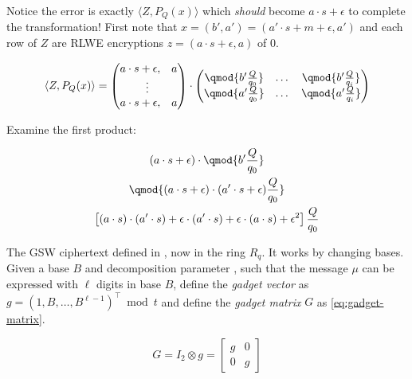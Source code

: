 \noindent Notice the error is exactly $\langle Z, P_Q(x)\rangle$ which \textit{should} become $a \cdot s + \epsilon$ to complete the transformation! First note that $x = (b', a') = (a'\cdot s + m + \epsilon, a')$ and each row of $Z$ are RLWE encryptions $z = (a\cdot s + \epsilon, a)$ of 0.

\begin{equation*}
    \langle Z, P_Q(x)\rangle = 
        \begin{pmatrix}
            a\cdot s + \epsilon, & a \\
            \quad\;\vdots \\
            a\cdot s + \epsilon, & a \\
        \end{pmatrix}\cdot 
        \begin{pmatrix}
            \qmod{b'\frac{Q}{q_0}} & \dots & \qmod{b'\frac{Q}{q_i}} \\
            \qmod{a'\frac{Q}{q_0}} & \dots & \qmod{a'\frac{Q}{q_i}}
        \end{pmatrix}
\end{equation*}

\noindent Examine the first product:

\begin{gather*}
    (a\cdot s + \epsilon) \cdot \qmod{b'\frac{Q}{q_0}} \\
    \qmod{(a\cdot s + \epsilon) \cdot (a'\cdot s + \epsilon)\frac{Q}{q_0}} \\
    \left[(a\cdot s) \cdot (a'\cdot s) + \epsilon\cdot (a'\cdot s) + \epsilon\cdot (a\cdot s) + \epsilon^2 \right]\frac{Q}{q_0}
\end{gather*}

\newpage
The GSW ciphertext defined in \cite{cryptoeprint:2013/340}, now in the ring $R_q$. It works by changing bases. Given a base $B$ and decomposition parameter \paramDecomp, such that the message $\mu$ can be expressed with $\ell$ digits in base $B$, define the \emph{gadget vector} as $g = (1, B, \dots, B^{\ell - 1})^\intercal\bmod{t}$ and define the \emph{gadget matrix} $G$ as \eqref{eq:gadget-matrix}.

\begin{equation}
    \label{eq:gadget-matrix}
    G = I_2 \otimes g =
    \begin{bmatrix}
        g & 0 \\
        0 & g
    \end{bmatrix}
\end{equation}

